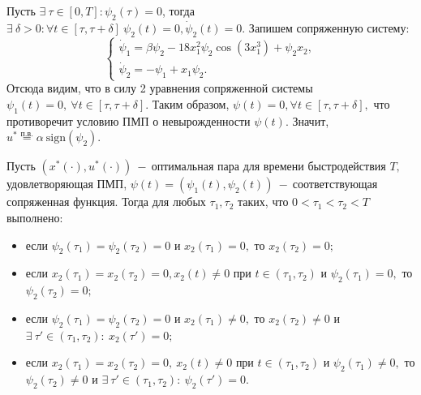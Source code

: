 \documentclass{article}
\begin{document}
Пусть $\exists ~\tau \in [0, T]: \psi_2(\tau) = 0$, тогда $\exists ~\delta>0: \forall t\in[\tau, \tau+\delta] ~ \psi_2(t) = 0, \dot{\psi}_2(t) = 0.$
Запишем сопряженную систему:
$$
\begin{cases}
    \dot{\psi}_1 = \beta \psi_2 - 18x_1^2\psi_2\cos(3x_1^3) + \psi_2 x_2,\\
    \dot{\psi}_2 = -\psi_1 + x_1\psi_2.
\end{cases}
$$
Отсюда видим, что в силу 2 уравнения сопряженной системы $\psi_1(t)= 0, ~\forall t\in[\tau, \tau+\delta].$ Таким образом, $\psi(t) = 0, \forall t\in[\tau, \tau+\delta],$ что противоречит условию ПМП о невырожденности $\psi(t).$ Значит, $u^* \overset{\text{п.в.}}{=} \alpha~\text{sign}(\psi_2).$\\
\begin{теорема}
Пусть $(x^*(\cdot), u^*(\cdot))~-~$оптимальная пара для времени быстродействия $T,$ удовлетворяющая ПМП, $\psi(t) = (\psi_1(t), \psi_2(t))~-~$соответствующая сопряженная функция. Тогда для любых $\tau_1, \tau_2$ таких, что $0<\tau_1<\tau_2<T$ выполнено:
\begin{itemize}
    \item [1.] если $\psi_2(\tau_1) = \psi_2(\tau_2) = 0$ и $x_2(\tau_1) = 0,$ то $x_2(\tau_2)= 0;$
    \item [2.] если $x_2(\tau_1) = x_2(\tau_2) = 0, x_2(t) \neq 0$ при $t\in (\tau_1, \tau_2)$ и $\psi_2(\tau_1) = 0,$ то $\psi_2(\tau_2) = 0;$
    \item [3.] если $\psi_2(\tau_1)=\psi_2(\tau_2)=0$ и $x_2(\tau_1)\neq 0,$ то $x_2(\tau_2)\neq 0$ и $\exists ~\tau'\in(\tau_1, \tau_2): ~x_2(\tau')= 0;$
    \item [4.] если $x_2(\tau_1)=x_2(\tau_2)=0, ~x_2(t)\neq 0$ при $t\in (\tau_1, \tau_2)$ и $\psi_2(\tau_1)\neq 0,$ то $\psi_2(\tau_2)\neq 0$ и $\exists ~\tau'\in(\tau_1, \tau_2): ~\psi_2(\tau')= 0.$
\end{itemize}
\end{теорема}
\renewcommand{\proofname}{Доказательство}
\end{document}
